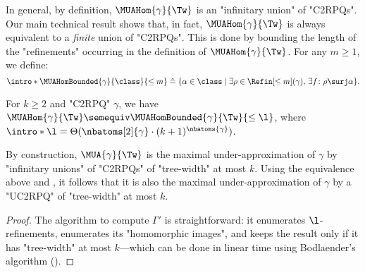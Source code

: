 In general, by definition,
$\MUAHom{\gamma}{\Tw}$ is an "infinitary union" of "C2RPQs". Our main technical result shows that,
in fact, $\MUAHom{\gamma}{\Tw}$ is always equivalent to a \emph{finite} union of "C2RPQs". This is done by bounding the length of the "refinements" occurring in the definition of $\MUAHom{\gamma}{\Tw}$.
For any $m \geq 1$, we define:
\AP
\[
    \intro*\MUAHomBounded{\gamma}{\class}{\leq m} \defeq 
    \{ 
        \alpha \in \class
        \mid
        \exists \rho \in \Refin[\leq m](\gamma),\, \exists \fun\colon \rho \surj \alpha
    \}.
\]
\newcommand{\lbound}[2]{\Theta(\nbatoms[2]{#2}\cdot ({#1}+1)^{\nbatoms{#2}})}
\begin{lemma}
    \AP\label{lemma:bound_size_refinements}
    \AP For $k \geq 2$ and "C2RPQ" $\gamma$, we have
    $\MUAHom{\gamma}{\Tw} \semequiv \MUAHomBounded{\gamma}{\Tw}{\leq\l}$, where
    $\intro*\l = \lbound{k}{\gamma}$.
\end{lemma}
By construction, $\MUA{\gamma}{\Tw}$ is the maximal under-approximation of $\gamma$ by
"infinitary unions" of "C2RPQs" of "tree-width" at most $k$. Using the equivalence above and
, it follows that
it is also the maximal under-approximation of $\gamma$ by
a "UC2RPQ" of "tree-width" at most $k$.
\muaexistseffective
\begin{proof}
	The algorithm to compute $\Gamma'$ is straightforward:
	it enumerates $\l$-refinements, enumerates its "homomorphic images",
	and keeps the result only if it has "tree-width" at most $k$---which can
	be done in linear time using Bodlaender's algorithm ().
\end{proof}

